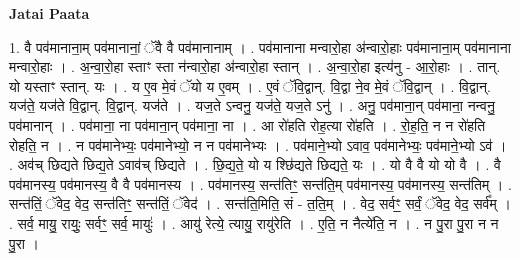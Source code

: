 \documentclass[17pt]{extarticle}
\begin{document}
\textbf{Jatai Paata} \newline

1. वै पव॑मानाना॒म् पव॑मानानां॒ ॅवै वै पव॑मानानाम् । . पव॑मानाना मन्वारो॒हा अ॑न्वारो॒हाः पव॑मानाना॒म् पव॑मानाना मन्वारो॒हाः । . अ॒न्वा॒रो॒हा स्ताꣳ स्ता न॑न्वारो॒हा अ॑न्वारो॒हा स्तान् । . अ॒न्वा॒रो॒हा इत्य॑नु - आ॒रो॒हाः । . तान्. यो यस्ताꣳ स्तान्. यः । . य ए॒व मे॒वं ॅयो य ए॒वम् । . ए॒वं ॅवि॒द्वान्. वि॒द्वा ने॒व मे॒वं ॅवि॒द्वान् । . वि॒द्वान्. यज॑ते॒ यज॑ते वि॒द्वान्. वि॒द्वान्. यज॑ते । . यज॒ते ऽन्वनु॒ यज॑ते॒ यज॒ते ऽनु॑ । . अनु॒ पव॑माना॒न् पव॑माना॒ नन्वनु॒ पव॑मानान् । . पव॑माना॒ ना पव॑माना॒न् पव॑माना॒ ना । . आ रो॑हति रोह॒त्या रो॑हति । . रो॒ह॒ति॒ न न रो॑हति रोहति॒ न । . न पव॑मानेभ्यः॒ पव॑मानेभ्यो॒ न न पव॑मानेभ्यः । . पव॑माने॒भ्यो ऽवाव॒ पव॑मानेभ्यः॒ पव॑माने॒भ्यो ऽव॑ । . अव॑च् छिद्यते छिद्य॒ते ऽवाव॑च् छिद्यते । . छि॒द्य॒ते॒ यो य श्छि॑द्यते छिद्यते॒ यः । . यो वै वै यो यो वै । . वै पव॑मानस्य॒ पव॑मानस्य॒ वै वै पव॑मानस्य । . पव॑मानस्य॒ सन्त॑तिꣳ॒॒ सन्त॑ति॒म् पव॑मानस्य॒ पव॑मानस्य॒ सन्त॑तिम् । . सन्त॑तिं॒ ॅवेद॒ वेद॒ सन्त॑तिꣳ॒॒ सन्त॑तिं॒ ॅवेद॑ । . सन्त॑ति॒मिति॒ सं - त॒ति॒म् । . वेद॒ सर्वꣳ॒॒ सर्वं॒ ॅवेद॒ वेद॒ सर्व᳚म् । . सर्व॒ मायु॒ रायुः॒ सर्वꣳ॒॒ सर्व॒ मायुः॑ । . आयु॑ रेत्ये॒ त्यायु॒ रायु॑रेति । . ए॒ति॒ न नैत्ये॑ति॒ न । . न पु॒रा पु॒रा न न पु॒रा । \newline
\end{document}
